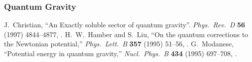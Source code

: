 \begin{thebibliography}{99}
\subsubsection*{Quantum Gravity}
  J.~Christian,
  ``An Exactly soluble sector of quantum gravity''.
  \emph{Phys.\ Rev.\ D} {\bf 56} (1997) 4844--4877,
  .
  H.~W.~Hamber and S.~Liu,
  ``On the quantum corrections to the Newtonian potential,''
  \emph{Phys.\ Lett.\ B} {\bf 357} (1995) 51--56,
  .
  G.~Modanese,
  ``Potential energy in quantum gravity,''
  \emph{Nucl.\ Phys.\ B} {\bf 434} (1995) 697--708,
  .

\end{thebibliography}
